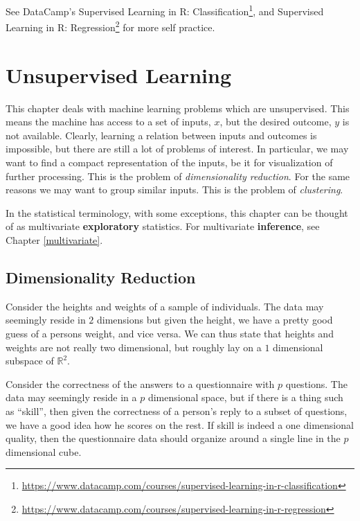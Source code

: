 \documentclass[]{book}
\renewcommand{\href}[2]{#2\footnote{\url{#1}}}
\theoremstyle{definition}
\theoremstyle{definition}
\theoremstyle{definition}
\theoremstyle{remark}
\let\BeginKnitrBlock\begin \let\EndKnitrBlock\end
\begin{document}
See DataCamp's \href{https://www.datacamp.com/courses/supervised-learning-in-r-classification}{Supervised Learning in R: Classification}, and \href{https://www.datacamp.com/courses/supervised-learning-in-r-regression}{Supervised Learning in R: Regression} for more self practice.

\hypertarget{unsupervised}{%
\chapter{Unsupervised Learning}\label{unsupervised}}

This chapter deals with machine learning problems which are unsupervised.
This means the machine has access to a set of inputs, \(x\), but the desired outcome, \(y\) is not available.
Clearly, learning a relation between inputs and outcomes is impossible, but there are still a lot of problems of interest.
In particular, we may want to find a compact representation of the inputs, be it for visualization of further processing.
This is the problem of \emph{dimensionality reduction}.
For the same reasons we may want to group similar inputs. This is the problem of \emph{clustering}.

In the statistical terminology, with some exceptions, this chapter can be thought of as multivariate \textbf{exploratory} statistics.
For multivariate \textbf{inference}, see Chapter \ref{multivariate}.

\hypertarget{dim-reduce}{%
\section{Dimensionality Reduction}\label{dim-reduce}}

\BeginKnitrBlock{example}
\protect\hypertarget{exm:bmi}{}{\label{exm:bmi} }Consider the heights and weights of a sample of individuals.
The data may seemingly reside in \(2\) dimensions but given the height, we have a pretty good guess of a persons weight, and vice versa.
We can thus state that heights and weights are not really two dimensional, but roughly lay on a \(1\) dimensional subspace of \(\mathbb{R}^2\).
\EndKnitrBlock{example}

\BeginKnitrBlock{example}
\protect\hypertarget{exm:iq}{}{\label{exm:iq} }Consider the correctness of the answers to a questionnaire with \(p\) questions.
The data may seemingly reside in a \(p\) dimensional space, but if there is a thing such as ``skill'', then given the correctness of a person's reply to a subset of questions, we have a good idea how he scores on the rest.
If skill is indeed a one dimensional quality, then the questionnaire data should organize around a single line in the \(p\) dimensional cube.
\EndKnitrBlock{example}
\end{document}
